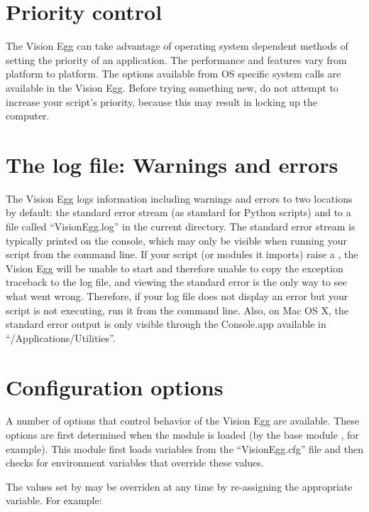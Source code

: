 \documentclass{manual}
\begin{document}
\section{Priority control}

The Vision Egg can take advantage of operating system dependent
methods of setting the priority of an application.  The performance
and features vary from platform to platform.  The options available
from OS specific system calls are available in the Vision Egg.  Before
trying something new, do not attempt to increase your script's
priority, because this may result in locking up the computer.

\section{The log file: Warnings and errors}

The Vision Egg logs information including warnings and errors to two
locations by default: the standard error stream (as standard for
Python scripts) and to a file called ``VisionEgg.log'' in the current
directory.  The standard error stream is typically printed on the
console, which may only be visible when running your script from the
command line.  If your script (or modules it imports) raise a
, the Vision Egg will be unable to start and
therefore unable to copy the exception traceback to the log file, and
viewing the standard error is the only way to see what went wrong.
Therefore, if your log file does not display an error but your script
is not executing, run it from the command line.  Also, on Mac OS X,
the standard error output is only visible through the Console.app
available in ``/Applications/Utilities''.

\section{Configuration options}

A number of options that control behavior of the Vision Egg are
available.  These options are first determined when the
 module is loaded (by the base module
, for example).  This module first loads variables
from the ``VisionEgg.cfg'' file and then checks for environment
variables that override these values.

The values set by  may be overriden at
any time by re-assigning the appropriate variable.  For example:
\end{document}

